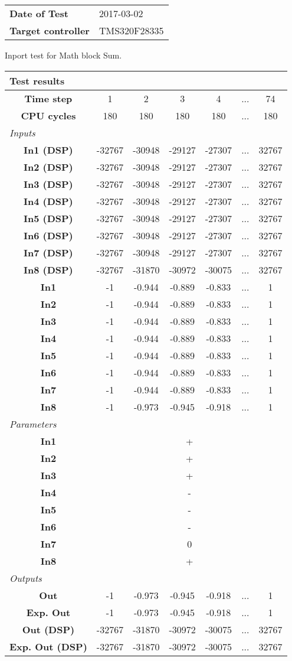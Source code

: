 \begin{tabular}{l l}
\textbf{Date of Test} & 2017-03-02 \tabularnewline
\textbf{Target controller} & TMS320F28335 \tabularnewline
\end{tabular}
\vspace{1ex}
Inport test for Math block Sum.

\vspace{1em}
\begin{tabularx}{\textwidth}{|c|c|c|c|c|>{\centering\arraybackslash}X|c|}
\hline
\multicolumn{7}{|l|}{\cellcolor[gray]{0.8}\textbf{Test results}} \tabularnewline \hline
\textbf{Time step} & 1 & 2 & 3 & 4 & ... & 74 \tabularnewline \hline
\textbf{CPU cycles} & 180 & 180 & 180 & 180 & ... & 180 \tabularnewline \hline
\multicolumn{7}{|l|}{\cellcolor[gray]{0.9}\textit{Inputs}} \tabularnewline \hline
\textbf{In1 (DSP)} & -32767 & -30948 & -29127 & -27307 & ... & 32767 \tabularnewline \hline
\textbf{In2 (DSP)} & -32767 & -30948 & -29127 & -27307 & ... & 32767 \tabularnewline \hline
\textbf{In3 (DSP)} & -32767 & -30948 & -29127 & -27307 & ... & 32767 \tabularnewline \hline
\textbf{In4 (DSP)} & -32767 & -30948 & -29127 & -27307 & ... & 32767 \tabularnewline \hline
\textbf{In5 (DSP)} & -32767 & -30948 & -29127 & -27307 & ... & 32767 \tabularnewline \hline
\textbf{In6 (DSP)} & -32767 & -30948 & -29127 & -27307 & ... & 32767 \tabularnewline \hline
\textbf{In7 (DSP)} & -32767 & -30948 & -29127 & -27307 & ... & 32767 \tabularnewline \hline
\textbf{In8 (DSP)} & -32767 & -31870 & -30972 & -30075 & ... & 32767 \tabularnewline \hline
\textbf{In1} & -1 & -0.944 & -0.889 & -0.833 & ... & 1 \tabularnewline \hline
\textbf{In2} & -1 & -0.944 & -0.889 & -0.833 & ... & 1 \tabularnewline \hline
\textbf{In3} & -1 & -0.944 & -0.889 & -0.833 & ... & 1 \tabularnewline \hline
\textbf{In4} & -1 & -0.944 & -0.889 & -0.833 & ... & 1 \tabularnewline \hline
\textbf{In5} & -1 & -0.944 & -0.889 & -0.833 & ... & 1 \tabularnewline \hline
\textbf{In6} & -1 & -0.944 & -0.889 & -0.833 & ... & 1 \tabularnewline \hline
\textbf{In7} & -1 & -0.944 & -0.889 & -0.833 & ... & 1 \tabularnewline \hline
\textbf{In8} & -1 & -0.973 & -0.945 & -0.918 & ... & 1 \tabularnewline \hline
\multicolumn{7}{|l|}{\cellcolor[gray]{0.9}\textit{Parameters}} \tabularnewline \hline
\textbf{In1} & \multicolumn{6}{c|}{+} \tabularnewline \hline
\textbf{In2} & \multicolumn{6}{c|}{+} \tabularnewline \hline
\textbf{In3} & \multicolumn{6}{c|}{+} \tabularnewline \hline
\textbf{In4} & \multicolumn{6}{c|}{-} \tabularnewline \hline
\textbf{In5} & \multicolumn{6}{c|}{-} \tabularnewline \hline
\textbf{In6} & \multicolumn{6}{c|}{-} \tabularnewline \hline
\textbf{In7} & \multicolumn{6}{c|}{0} \tabularnewline \hline
\textbf{In8} & \multicolumn{6}{c|}{+} \tabularnewline \hline
\multicolumn{7}{|l|}{\cellcolor[gray]{0.9}\textit{Outputs}} \tabularnewline \hline
\textbf{Out} & -1 & -0.973 & -0.945 & -0.918 & ... & 1 \tabularnewline \hline
\textbf{Exp. Out} & -1 & -0.973 & -0.945 & -0.918 & ... & 1 \tabularnewline \hline
\textbf{Out (DSP)} & -32767 & -31870 & -30972 & -30075 & ... & 32767 \tabularnewline \hline
\textbf{Exp. Out (DSP)} & -32767 & -31870 & -30972 & -30075 & ... & 32767 \tabularnewline \hline
\end{tabularx}
